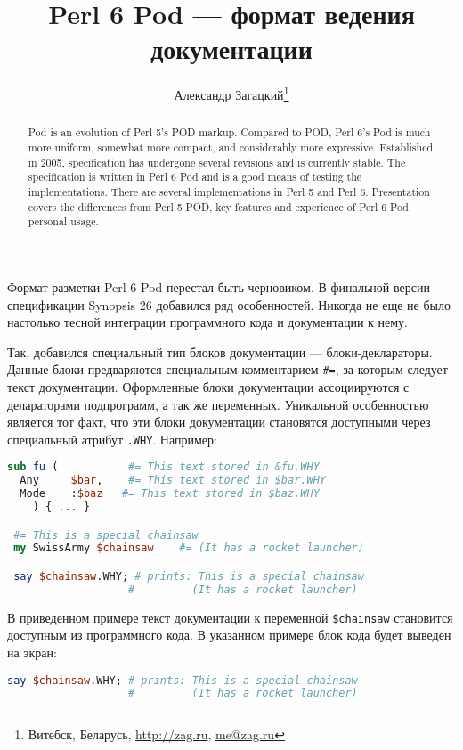 \documentclass[10pt, a5paper]{article}
\begin{document}
\title{Perl 6 Pod --- формат ведения документации}
\author{Александр Загацкий\footnote{Витебск, Беларусь, \url{http://zag.ru}, \url{me@zag.ru}}}
\date{}
\maketitle

\begin{abstract}
Pod is an evolution of Perl 5's POD markup. Compared to POD, Perl 6's
Pod is much more
uniform, somewhat more compact, and considerably more
expressive. Established in 2005, specification
has undergone several revisions and is currently stable. The
specification is written in Perl 6 Pod and is a
good means of testing the implementations.
There are several implementations in Perl 5 and Perl 6.
Presentation covers the differences from Perl 5 POD, key features and 
experience of Perl 6 Pod personal usage.
\end{abstract}

Формат разметки Perl 6 Pod перестал быть черновиком. В финальной версии
спецификации Synopsis 26 \cite{zag1pod} добавился ряд особенностей.
Никогда не еще не было настолько тесной интеграции программного кода и
документации к нему.

Так, добавился специальный тип блоков документации --- блоки-деклараторы.
Данные блоки предваряются специальным комментарием \verb!#=!, за которым
следует текст документации. Оформленные блоки документации ассоциируются
с делараторами подпрограмм, а так же переменных. Уникальной особенностью
является тот факт, что эти блоки документации становятся доступными
через специальный атрибут \verb!.WHY!. Например:

\begin{lstlisting}[language={Perl}]
 sub fu (           #= This text stored in &fu.WHY
  Any     $bar,    #= This text stored in $bar.WHY
  Mode    :$baz   #= This text stored in $baz.WHY
    ) { ... }

 #= This is a special chainsaw
 my SwissArmy $chainsaw    #= (It has a rocket launcher)

 say $chainsaw.WHY; # prints: This is a special chainsaw
                   #         (It has a rocket launcher)
\end{lstlisting}


В приведенном примере текст документации к переменной \linebreak \verb!$chainsaw!
становится доступным из программного кода. В указанном примере блок кода
будет выведен на экран:
\begin{lstlisting}[language={Perl}]
 say $chainsaw.WHY; # prints: This is a special chainsaw
                   #         (It has a rocket launcher)
\end{lstlisting}
\end{document}
